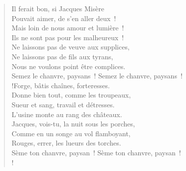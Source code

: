 \documentclass[french,twoside]{book} %
\begin{document}
\begin{verse}
\hspace{1em}Il ferait bon, si Jacques Misère\\
\hspace{1em}Pouvait aimer, de s’en aller deux !\\
\hspace{1em}Mais loin de nous amour et lumière !\\
\hspace{1em}Ils ne sont pas pour les malheureux !\\
\hspace{1em}Ne laissons pas de veuve aux supplices,\\
\hspace{1em}Ne laissons pas de fils aux tyrans,\\
\hspace{1em}Nous ne voulons point être complices.\\
Semez le chanvre, paysans ! Semez le chanvre, paysans !\\!\hspace{1em}Forge, bâtis chaînes, forteresses.\\
\hspace{1em}Donne bien tout, comme les troupeaux,\\
\hspace{1em}Sueur et sang, travail et détresses.\\
\hspace{1em}L’usine monte au rang des châteaux.\\
\hspace{1em}Jacques, vois-tu, la nuit sous les porches,\\
\hspace{1em}Comme en un songe au vol flamboyant,\\
\hspace{1em}Rouges, errer, les lueurs des torches.\\
Sème ton chanvre, paysan ! Sème ton chanvre, paysan !\\!
\end{verse}
\end{document}
